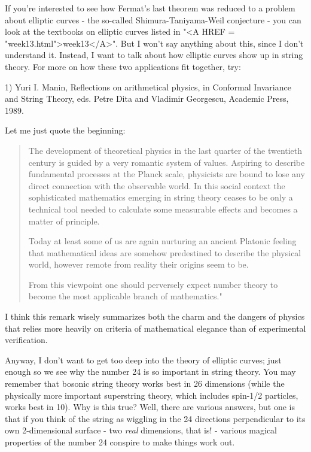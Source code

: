 If you're interested to see how Fermat's last theorem was reduced to a
problem about elliptic curves - the so-called Shimura-Taniyama-Weil 
conjecture - you can look at the textbooks on elliptic curves listed 
in "<A HREF = "week13.html">week13</A>".  
But I won't say anything about this, since I don't understand it.  
Instead, I want to talk about how elliptic curves show up in string
theory.  For more on how these two applications fit together, try:

1) Yuri I. Manin, Reflections on arithmetical physics, in Conformal
Invariance and String Theory, eds. Petre Dita and Vladimir Georgescu,
Academic Press, 1989.

Let me just quote the beginning:

\begin{quote}
     The development of theoretical physics in the last quarter of the
     twentieth century is guided by a very romantic system of values. 
     Aspiring to describe fundamental processes at the Planck scale,
     physicists are bound to lose any direct connection with the
     observable world.  In this social context the sophisticated
     mathematics emerging in string theory ceases to be only a technical
     tool needed to calculate some measurable effects and becomes a
     matter of principle.

     Today at least some of us are again nurturing an ancient Platonic
     feeling that mathematical ideas are somehow predestined to describe
     the physical world, however remote from reality their origins seem
     to be.

     From this viewpoint one should perversely expect number theory to
     become the most applicable branch of mathematics."

\end{quote}
I think this remark wisely summarizes both the charm and the dangers
of physics that relies more heavily on criteria of mathematical
elegance than of experimental verification.

Anyway, I don't want to get too deep into the theory of elliptic curves;
just enough so we see why the number 24 is so important in string
theory.   You may remember that bosonic string theory works best in 26
dimensions (while the physically more important superstring theory,
which includes spin-1/2 particles, works best in 10).  Why is this true?
Well, there are various answers, but one is that if you think of the
string as wiggling in the 24 directions perpendicular to its own
2-dimensional surface - two \emph{real} dimensions, that is! - various
magical properties of the number 24 conspire to make things work out.

